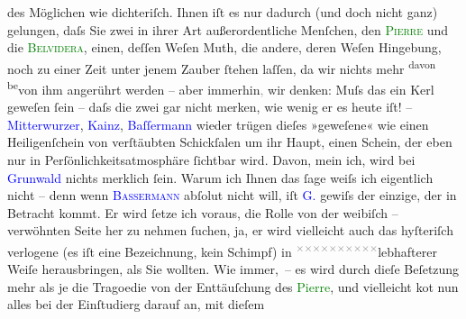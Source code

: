                des Möglichen wie dichteriſch. Ihnen iſt es nur dadurch (und doch nicht ganz)
               gelungen, daſs Sie zwei in ihrer Art außerordentliche Menſchen, den \textcolor{green}{\textsc{Pierre}}{} und die \textcolor{green}{\textsc{Belvidera}}{}, {\pb}einen, deſſen Weſen Muth, die andere, deren
               Weſen Hingebung, noch zu einer Zeit unter jenem Zauber ſtehen laſſen, da wir nichts
               mehr \substVorne{}\textsuperscript{davon be}{\allowbreak}\substDazwischen{}von ihm\substHinten{} angerührt werden – aber immerhin\textcolor{gray}{,} wir denken: Muſs das
               ein Kerl geweſen ſein – daſs die zwei gar nicht merken, wie wenig er es heute iſt! –
                  \textcolor{blue}{Mitterwurzer}{}\ledrightnote{\textcolor{blue}{Friedrich Mitterwurzer}}, \textcolor{blue}{Kainz}{}\ledrightnote{\textcolor{blue}{Josef Kainz}}, \textcolor{blue}{Baſſermann}{}\ledrightnote{\textcolor{blue}{Albert Bassermann}} wieder trügen dieſes
               »geweſene« wie einen Heiligenſchein von verſtäubten Schickſalen um ihr Haupt, einen
               Schein, der eben nur in Perſönlichkeitsatmosphäre ſichtbar {\pb}wird. Davon, mein ich, wird bei \textcolor{blue}{Grunwald}{}\ledrightnote{\textcolor{blue}{Willy Grunwald}} nichts merklich ſein. Warum ich Ihnen das ſage weiſs
               ich eigentlich nicht – denn wenn \textcolor{blue}{\textsc{Bassermann}}{}\ledrightnote{\textcolor{blue}{Albert Bassermann}} abſolut nicht will, iſt \textcolor{blue}{G.}{}\ledrightnote{\textcolor{blue}{Willy Grunwald}} gewiſs der
               einzige, der in Betracht kommt. Er wird ſetze ich voraus, die Rolle von der weibiſch
                   – verwöhnten Seite her zu nehmen ſuchen,  ja, er wird vielleicht auch das hyſteriſch
               verlogene (es iſt eine Bezeichnung, kein Schimpf) in \substVorne{}\textsuperscript{\textcolor{gray}{×}\-\textcolor{gray}{×}\-\textcolor{gray}{×}\-\textcolor{gray}{×}\-\textcolor{gray}{×}\-\textcolor{gray}{×}\-\textcolor{gray}{×}\-\textcolor{gray}{×}\-\textcolor{gray}{×}\-\textcolor{gray}{×}}\substDazwischen{}lebhafterer\substHinten{} Weiſe herausbringen, als Sie wollten. Wie immer, – es {\pb}wird durch dieſe Beſetzung  mehr als je die Tragoedie von der Enttäuſchung des \textcolor{green}{Pierre}{}, und vielleicht ko{\geminationm}t nun alles bei der Einſtudierg darauf an, mit dieſem
